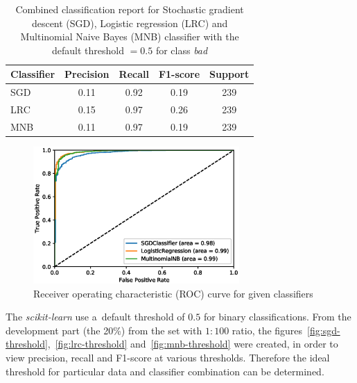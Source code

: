 \begin{table}[htb]
    \centering

    \begin{tabular}{lcccc}
        \toprule
        Classifier & Precision & Recall & F1-score & Support \\
        \midrule
        SGD & 0.11 & 0.92 & 0.19 & 239 \\
        LRC & 0.15 & 0.97 & 0.26 & 239 \\
        MNB & 0.11 & 0.97 & 0.19 & 239 \\
        \bottomrule
    \end{tabular}

    \caption{Combined classification report for Stochastic gradient descent (SGD), Logistic regression (LRC) and Multinomial Naive Bayes (MNB) classifier with the default threshold \(= 0.5 \) for class \textit{bad}}
    \label{table:combined-report}
\end{table}
\FloatBarrier

\begin{figure}[htb]
    \centering
    \includegraphics[width=0.7\textwidth]{imgs/roc.eps}
    \caption{Receiver operating characteristic (ROC) curve for given classifiers}
    \label{fig:roc}
\end{figure}
\FloatBarrier

The \textit{scikit-learn} use a~default threshold of \( 0.5 \) for binary classifications.
From the development part (the 20\%) from the set with \( 1:100 \) ratio, the figures~\ref{fig:sgd-threshold},~\ref{fig:lrc-threshold} and~\ref{fig:mnb-threshold} were created, in order to view precision, recall and F1-score at various thresholds.
Therefore the ideal threshold for particular data and classifier combination can be determined.

